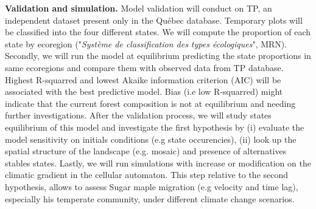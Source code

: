 \textbf{Validation and simulation.} Model validation will conduct on TP, an
independent dataset present only in the Québec database. Temporary plots will
be classified into the four different states. We will compute the proportion
of each state by ecoregion ("\textit{Système de classification des types
écologiques}", MRN). Secondly, we will run the model at equilibrium predicting
the state proportions in same ecoregions and compare them with observed data
from TP database. Highest R-squarred and lowest Akaike information criterion
(AIC) will be associated with the best predictive model. Bias (i.e low
R-squarred) might indicate that the current forest composition is not at
equilibrium and needing further investigations. After the validation process,
we will study states equilibrium of this model and investigate the first
hypothesis by (i) evaluate the model sensitivity on initials conditions (e.g
state occurencies), (ii) look up the spatial structure of the landscape (e.g.
mosaic) and presence of alternatives stables states. Lastly, we will run
simulations with increase or modification on the climatic gradient in the
cellular automaton. This step relative to the second hypothesis, allows to
assess Sugar maple migration (e.g velocity and time lag), especially his
temperate community, under different climate change scenarios.


\clearpage
\small

